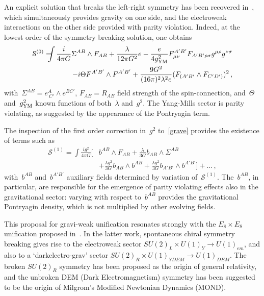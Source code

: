 \documentclass[reqno,11pt]{amsart}
\numberwithin{equation}{section}
\newcommand{\1}{\mbox{\rm 1 \hspace{-1.05 em} 1}}
\begin{document}
\begin{enumerate}[leftmargin=2em]
An explicit solution that breaks the left-right symmetry has been recovered in~\cite{Alexander_2014}, which simultaneously provides gravity on one side, and the electroweak interactions on the other side provided with parity violation. Indeed, at the lowest order of the symmetry breaking solution, one obtains 
\begin{eqnarray} \label{grave}
\mathcal{S}^{(0)}=\!\!\!\!\!\!\!\!\!&&\int \frac{i}{4 \pi G} \Sigma^{AB} \wedge F_{AB} + \frac{\lambda}{12 \pi G^2} e - \frac{e}{4 g^2_{\rm YM}} F^{A'B'}_{\mu \nu} F_{A'B' \rho \sigma} g^{\mu \rho} g^{\nu \sigma} \nonumber\\
&&- i \Theta F^{A'B'} \wedge F^{A'B'} + \frac{9G^2}{(16\pi)^2 \lambda^2 e}(F_{(A'B'}\wedge F_{C'D')})^2\,,
\end{eqnarray}
with~$\Sigma^{AB}=e^A_{\ C'} \wedge e^{B C'}$, $F_{AB}=R_{AB}$ field strength of the spin-connection, and~$\Theta$ and~$g^2_{\rm YM}$ known functions of both~$\lambda$ and~$g^2$. The Yang-Mills sector is parity violating, as suggested by the appearance of the Pontryagin term.

The inspection of the first order correction in~$g^2$ to~\eqref{grave} provides the existence of terms such as
\begin{align*} \label{grawi}
\mathcal{S}^{(1)}=
\int \frac{i g^2}{4 \pi G} \bigg[& b^{AB} \wedge F_{AB} + \frac{\lambda}{3G} b_{AB} \wedge \Sigma^{AB} \nonumber\\
&+  \frac{\lambda g^2}{3G} b_{AB} \wedge b^{AB} +  \frac{\lambda g^2}{3G} b_{A'B'} \wedge b^{A'B'} \bigg] 
+ \dots \,, %
\end{align*}
with~$b^{AB}$ and~$b^{A'B'}$ auxiliary fields determined by variation of~$\mathcal{S}^{(1)}$. The~$b^{AB}$, in particular, are responsible for the emergence of parity violating effects also in the gravitational sector: varying with respect to~$b^{AB}$ provides the gravitational Pontryagin density, which is not multiplied by other evolving fields.
\end{enumerate}

This proposal for gravi-weak unification resonates strongly with the $E_8 \times E_8$ unification proposed in~\cite{Kaushik}. In the latter work, spontaneous chiral symmetry breaking gives rise to the electroweak sector $SU(2)_L\times U(1)_Y \rightarrow U(1)_{em}$, and also to a `darkelectro-grav' sector $SU(2)_R \times U(1)_{YDEM}\rightarrow U(1)_{DEM}$. The broken $SU(2)_R$ symmetry has been proposed as the origin of general relativity, and the unbroken DEM (Dark Electromagnetism) symmetry has been suggested~\cite{mond} to be the origin of Milgrom's Modified Newtonian Dynamics (MOND). 
\end{document}
